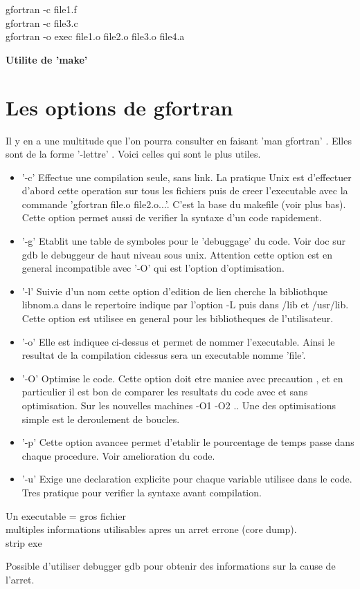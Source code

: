 \documentclass[12pt]{article}
\begin{document}
gfortran -c file1.f \\

gfortran -c file3.c \\
gfortran -o exec file1.o file2.o file3.o file4.a

{\bf Utilite de 'make'}

\section{Les options de gfortran}

Il y en a une multitude que l'on pourra consulter en faisant
'man gfortran' . Elles sont de la forme '-lettre' . Voici celles
qui sont le plus utiles.

\begin{itemize}


\item '-c' Effectue une compilation seule, sans link. La pratique Unix
  est d'effectuer d'abord cette operation sur tous les fichiers puis
  de creer l'executable avec la commande 'gfortran file.o file2.o...'.
  C'est la base du makefile (voir plus bas).
  Cette option permet aussi de verifier la syntaxe d'un code rapidement.

\item '-g' Etablit une table de symboles pour le 'debuggage' du code. Voir
  doc sur gdb le debuggeur de haut niveau sous unix. Attention cette
  option est en general incompatible avec '-O' qui est l'option d'optimisation.

\item '-l' Suivie d'un nom cette option d'edition de lien cherche la bibliothque
  libnom.a dans le repertoire indique par l'option -L puis dans /lib et
  /usr/lib. Cette option est utilisee en general pour les bibliotheques
  de l'utilisateur.

\item '-o' Elle est indiquee ci-dessus et permet de nommer l'executable.
  Ainsi le resultat de la compilation cidessus sera un executable nomme
  'file'.

\item '-O' Optimise le code. Cette option doit etre maniee avec precaution
   , et en particulier il est bon de comparer les resultats du code
   avec et sans optimisation. Sur les nouvelles machines -O1 -O2 ..
   Une des optimisations simple est le deroulement de boucles.

\item '-p' Cette option avancee permet d'etablir le pourcentage de temps
   passe dans chaque procedure. Voir amelioration du code.

\item '-u'  Exige une declaration explicite pour chaque variable utilisee
   dans le code. Tres pratique pour verifier la syntaxe avant compilation.

\end{itemize}

Un executable = gros fichier \\
multiples informations utilisables apres un arret errone (core
dump). \\
strip exe



Possible d'utiliser debugger gdb pour obtenir
des informations sur la cause de l'arret. 
\end{document}
